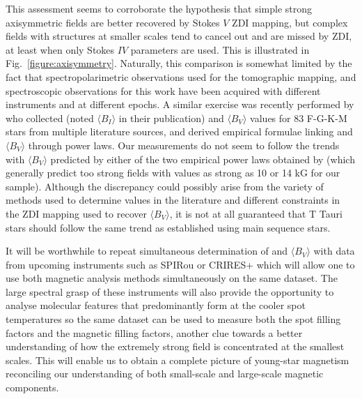 \documentclass{aa}
\begin{document}
This assessment seems to corroborate the hypothesis that simple strong axisymmetric fields are better recovered by Stokes $V$ ZDI mapping, but complex fields with structures at smaller scales tend to cancel out and are missed by ZDI, at least when only Stokes $IV$ parameters are used. This is illustrated in Fig.~\ref{figure:axisymmetry}. Naturally, this comparison is somewhat limited by the fact that spectropolarimetric observations used for the tomographic mapping, and spectroscopic observations for this work have been acquired with different instruments and at different epochs. A similar exercise was recently performed by \citet{2019ApJ...876..118S} who collected {\bb} (noted $\langle B_I \rangle$ in their publication) and $\langle B_V \rangle$ values for 83 F-G-K-M stars from multiple literature sources, and derived empirical formulae linking {\bb} and $\langle B_V \rangle$ through power laws. Our {\bb} measurements do not seem to follow the trends with $\langle B_V \rangle$ predicted by either of the two empirical power laws obtained by \citet{2019ApJ...876..118S} (which generally predict too strong fields with {\bb} values as strong as 10 or 14 kG for our sample). Although the discrepancy could possibly arise from the variety of methods used to determine {\bb} values in the literature and different constraints in the ZDI mapping used to recover $\langle B_V \rangle$, it is not at all guaranteed that T Tauri stars should follow the same trend as established using main sequence stars. 

It will be worthwhile to repeat simultaneous determination of {\bb} and $\langle B_V \rangle$ with data from upcoming instruments such as SPIRou or CRIRES+ which will allow one to use both magnetic analysis methods simultaneously on the same dataset. The large spectral grasp of these instruments will also provide the opportunity to analyse molecular features that predominantly form at the cooler spot temperatures so the same dataset can be used to measure both the spot filling factors \citep{2017ApJ...836..200G} and the magnetic filling factors, another clue towards a better understanding of how the extremely strong field is concentrated at the smallest scales. This will enable us to obtain a complete picture of young-star magnetism reconciling our understanding of both small-scale and large-scale magnetic components.
\end{document}

